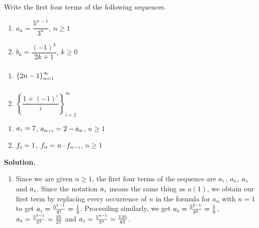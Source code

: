 \documentclass{ximera}
\begin{document}
\begin{example} \label{seqex1}  Write the first four terms of the following sequences.

\begin{multicols}{2}
\begin{enumerate}


\item  $a_{n} = \dfrac{5^{n-1}}{3^{n}}$, $n \geq 1$

\item  $b_{k} = \dfrac{(-1)^{k}}{2k+1}$, $k \geq 0$

\setcounter{HW}{\value{enumi}}
\end{enumerate}
\end{multicols}

\begin{multicols}{2}
\begin{enumerate}
\setcounter{enumi}{\value{HW}}

\item  $\left\{ 2n - 1 \right\}_{n=1}^{\infty} \vphantom{\left\{\dfrac{1 + (-1)^{i}}{i} \right\}_{i=2}^{\infty}}$

\item  $\left\{\dfrac{1 + (-1)^{i}}{i} \right\}_{i=2}^{\infty}$

\setcounter{HW}{\value{enumi}}
\end{enumerate}
\end{multicols}

\begin{multicols}{2}
\begin{enumerate}
\setcounter{enumi}{\value{HW}}


\item\label{introrecursiveex01}  $a_{\text{\tiny$1$}} = 7$, $a_{n \text{\tiny$ + 1$}} = 2 - a_{n}$, $n \geq 1$

\item  \label{factorialintroex} $f_{\text{\tiny$0$}} = 1$, $f_{n} =n \cdot f_{n-\text{\tiny$1$}}$, $n \geq 1$

\setcounter{HW}{\value{enumi}}
\end{enumerate}
\end{multicols}



{\bf Solution.}

\begin{enumerate}

\item Since we are given $n \geq 1$, the first four terms of the sequence are  $a_{\text{\tiny$1$}}$, $a_{\text{\tiny$2$}}$, $a_{\text{\tiny$3$}}$ and $a_{\text{\tiny$4$}}$.  Since the notation $a_{\text{\tiny$1$}}$ means the same thing as $a(1)$, we obtain our first term by replacing every occurrence of $n$ in the formula for $a_{n}$ with $n=1$ to get  $a_{\text{\tiny$1$}} = \frac{5^{1-1}}{3^{1}} = \frac{1}{3}$.  Proceeding similarly, we get $a_{\text{\tiny$2$}} = \frac{5^{2-1}}{3^{2}} =\frac{5}{9}$, $a_{\text{\tiny$3$}} = \frac{5^{3-1}}{3^{3}} =\frac{25}{27}$ and $a_{\text{\tiny$4$}} = \frac{5^{4-1}}{3^{4}} =\frac{125}{81}$.  


\end{enumerate}
\end{example}
\end{document}
